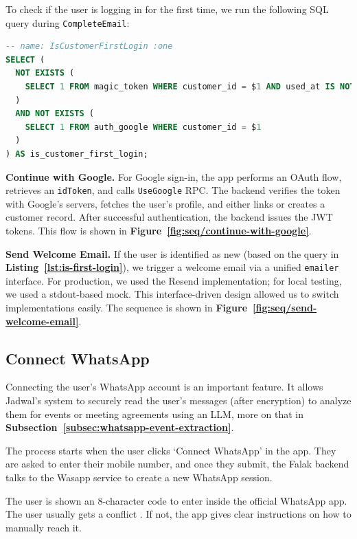 To check if the user is logging in for the first time, we run the following SQL query during \texttt{CompleteEmail}:

\begin{lstlisting}[language=SQL, caption={Check for First Login}, label={lst:is-first-login}]
-- name: IsCustomerFirstLogin :one
SELECT (
  NOT EXISTS (
    SELECT 1 FROM magic_token WHERE customer_id = $1 AND used_at IS NOT NULL
  )
  AND NOT EXISTS (
    SELECT 1 FROM auth_google WHERE customer_id = $1
  )
) AS is_customer_first_login;
\end{lstlisting}

\textbf{Continue with Google.} For Google sign-in, the app performs an OAuth flow, retrieves an \texttt{idToken}, and calls \texttt{UseGoogle} RPC. The backend verifies the token with Google's servers, fetches the user's profile, and either links or creates a customer record. After successful authentication, the backend issues the JWT tokens. This flow is shown in \textbf{Figure~\ref{fig:seq/continue-with-google}}.

\textbf{Send Welcome Email.} If the user is identified as new (based on the query in \textbf{Listing~\ref{lst:is-first-login}}), we trigger a welcome email via a unified \texttt{emailer} interface. For production, we used the Resend implementation; for local testing, we used a stdout-based mock. This interface-driven design allowed us to switch implementations easily. The sequence is shown in \textbf{Figure~\ref{fig:seq/send-welcome-email}}.

\subsection{Connect WhatsApp}

Connecting the user's WhatsApp account is an important feature. It allows Jadwal's system to securely read the user's messages (after encryption) to analyze them for events or meeting agreements using an LLM, more on that in \textbf{Subsection~\ref{subsec:whatsapp-event-extraction}}.

The process starts when the user clicks `Connect WhatsApp' in the app. They are asked to enter their mobile number, and once they submit, the Falak backend talks to the Wasapp service to create a new WhatsApp session.

The user is shown an 8-character code to enter inside the official WhatsApp app. The user usually gets a conflict . If not, the app gives clear instructions on how to manually reach it.

